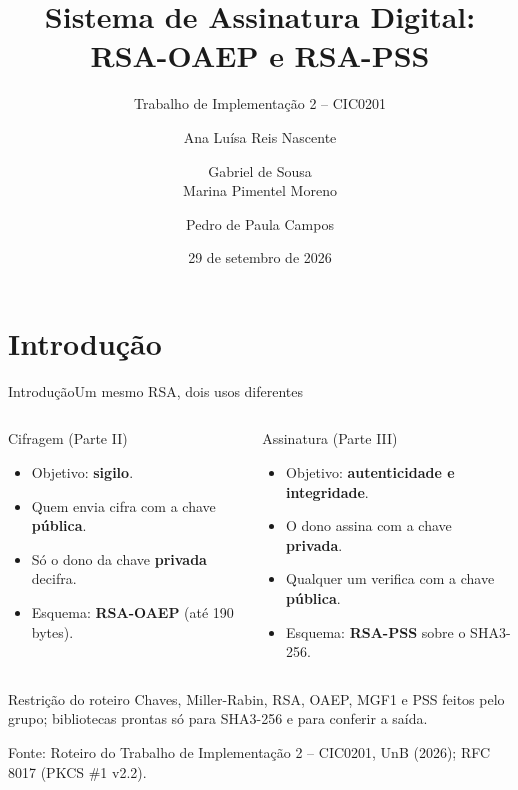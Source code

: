 \documentclass[10pt,aspectratio=169]{beamer}
\title[Assinatura Digital RSA]{\textbf{Sistema de Assinatura Digital:\\RSA-OAEP e RSA-PSS}}
\subtitle[CIC0201]{Trabalho de Implementação 2 -- CIC0201}
\author[Grupo]{Ana Luísa Reis Nascente \and Gabriel de Sousa\\Marina Pimentel Moreno \and Pedro de Paula Campos}
\institute[]{Segurança Computacional\\Universidade de Brasília}
\date{29 de setembro de 2026}
\newcommand{\source}[1]{\vfill{\tiny\color{gray}Fonte: #1}}
\begin{document}
{\1
\begin{frame}
  \titlepage
\end{frame}}

\section{Introdução}
\begin{frame}{Introdução}{Um mesmo RSA, dois usos diferentes}
  \begin{columns}[T,onlytextwidth]
      \begin{block}{Cifragem (Parte II)}
        \begin{itemize}
          \item Objetivo: \textbf{sigilo}.
          \item Quem envia cifra com a chave \textbf{pública}.
          \item Só o dono da chave \textbf{privada} decifra.
          \item Esquema: \textbf{RSA-OAEP} (até 190 bytes).
        \end{itemize}
      \end{block}
      \begin{block}{Assinatura (Parte III)}
        \begin{itemize}
          \item Objetivo: \textbf{autenticidade e integridade}.
          \item O dono assina com a chave \textbf{privada}.
          \item Qualquer um verifica com a chave \textbf{pública}.
          \item Esquema: \textbf{RSA-PSS} sobre o SHA3-256.
        \end{itemize}
      \end{block}
  \end{columns}
  \vspace{2pt}
  \begin{alertblock}{Restrição do roteiro}
    Chaves, Miller-Rabin, RSA, OAEP, MGF1 e PSS feitos pelo grupo; bibliotecas prontas só para SHA3-256 e para conferir a saída.
  \end{alertblock}
  \source{Roteiro do Trabalho de Implementação 2 -- CIC0201, UnB (2026); RFC 8017 (PKCS \#1 v2.2).}
\end{frame}
\end{document}
